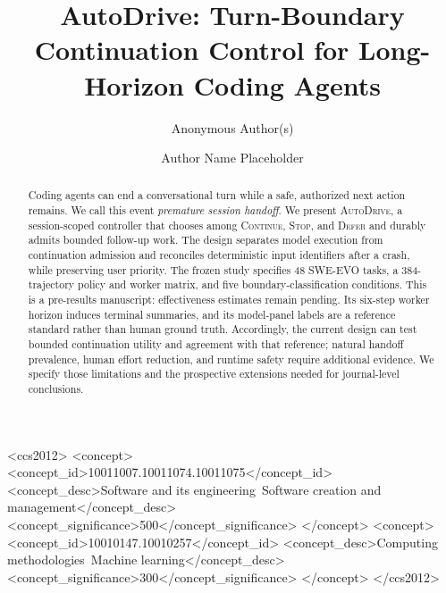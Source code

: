 \documentclass[sigconf,nonacm]{acmart}
\title{AutoDrive: Turn-Boundary Continuation Control for Long-Horizon Coding Agents}
\author{Anonymous Author(s)}
\affiliation{%
    \institution{Anonymous Institution}
    \city{Anonymous City}
    \country{Anonymous Country}}
\author{Author Name Placeholder}
\affiliation{%
    \institution{Affiliation Placeholder}
    \city{City Placeholder}
    \country{Country Placeholder}}
\newcommand{\system}{\textsc{AutoDrive}}
\newcommand{\continueaction}{\textsc{Continue}}
\newcommand{\stopaction}{\textsc{Stop}}
\newcommand{\deferaction}{\textsc{Defer}}
\begin{document}
\raggedbottom

\begin{abstract}
Coding agents can end a conversational turn while a safe, authorized next action remains. We call this event \emph{premature session handoff}. We present \system, a session-scoped controller that chooses among \continueaction, \stopaction, and \deferaction{} and durably admits bounded follow-up work. The design separates model execution from continuation admission and reconciles deterministic input identifiers after a crash, while preserving user priority. The frozen study specifies 48 SWE-EVO tasks, a 384-trajectory policy and worker matrix, and five boundary-classification conditions. This is a pre-results manuscript: effectiveness estimates remain pending. Its six-step worker horizon induces terminal summaries, and its model-panel labels are a reference standard rather than human ground truth. Accordingly, the current design can test bounded continuation utility and agreement with that reference; natural handoff prevalence, human effort reduction, and runtime safety require additional evidence. We specify those limitations and the prospective extensions needed for journal-level conclusions.
\end{abstract}

\begin{CCSXML}
<ccs2012>
 <concept>
  <concept_id>10011007.10011074.10011075</concept_id>
  <concept_desc>Software and its engineering~Software creation and management</concept_desc>
  <concept_significance>500</concept_significance>
 </concept>
 <concept>
  <concept_id>10010147.10010257</concept_id>
  <concept_desc>Computing methodologies~Machine learning</concept_desc>
  <concept_significance>300</concept_significance>
 </concept>
</ccs2012>
\end{CCSXML}


\maketitle

\begin{center}
\end{center}
\end{document}
